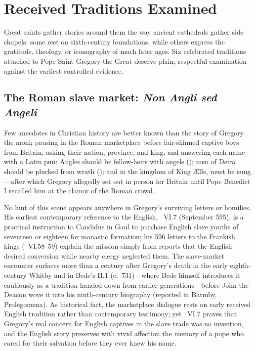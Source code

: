 \section{Received Traditions Examined}

Great saints gather stories around them the way ancient cathedrals gather side
chapels: some rest on sixth-century foundations, while others express the
gratitude, theology, or iconography of much later ages. Six celebrated
traditions attached to Pope Saint Gregory the Great deserve plain, respectful
examination against the earliest controlled evidence.

\subsection{The Roman slave market: \emph{Non Angli sed Angeli}}

Few anecdotes in Christian history are better known than the story of Gregory
the monk pausing in the Roman marketplace before fair-skinned captive boys from
Britain, asking their nation, province, and king, and answering each name with
a Latin pun: Angles should be fellow-heirs with angels (); men of Deira should be plucked from wrath (); and in
the kingdom of King \AE{}lle,  must be sung---after which
Gregory allegedly set out in person for Britain until Pope Benedict I recalled
him at the clamor of the Roman crowd.

No hint of this scene appears anywhere in Gregory's surviving letters or
homilies. His earliest contemporary reference to the English, \ VI.7
(September 595), is a practical instruction to Candidus in Gaul to purchase
English slave youths of seventeen or eighteen for monastic formation; his 596
letters to the Frankish kings (\ VI.58--59) explain the mission
simply from reports that the English desired conversion while nearby clergy
neglected them. The slave-market encounter surfaces more than a century after
Gregory's death in the early eighth-century Whitby  and in Bede's
 II.1 (c.\ 731)---where Bede himself introduces it
cautiously as a tradition handed down from earlier generations---before John
the Deacon wove it into his ninth-century biography (reported in Barmby,
Prolegomena). As historical fact, the marketplace dialogue rests on early
received English tradition rather than contemporary testimony; yet
\ VI.7 proves that Gregory's real concern for English captives in
the slave trade was no invention, and the English story preserves with vivid
affection the memory of a pope who cared for their salvation before they ever
knew his name.

